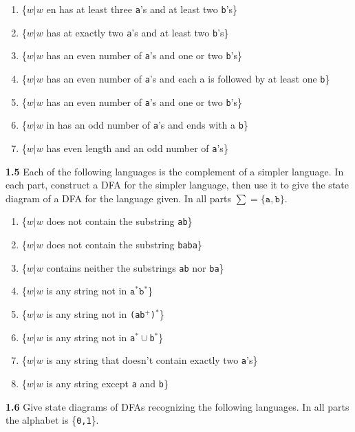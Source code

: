 \documentclass{article}
\begin{document}
    \begin{enumerate}
        \item \{$w|w$ en has at least three \texttt{a}'s and at least two \texttt{b}'s\}
        \item \{$w|w$ has at exactly two \texttt{a}'s and at least two \texttt{b}'s\}
        \item \{$w|w$ has an even number of \texttt{a}'s and one or two \texttt{b}'s\}
        \item \{$w|w$ has an even number of \texttt{a}'s and each a is followed by at least one \texttt{b}\}
        \item \{$w|w$ has an even number of \texttt{a}'s and one or two \texttt{b}'s\}
        \item \{$w|w$ in has an odd number of \texttt{a}'s and ends with a \texttt{b}\}
        \item \{$w|w$ has even length and an odd number of \texttt{a}'s\}
    \end{enumerate}

\textbf{1.5} Each of the following languages is the complement of a simpler
language. In each part, construct a DFA for the simpler language, then use it to
give the state diagram of a DFA for the language given. In all parts $\sum =
\{\texttt{a}, \texttt{b}\}$.

\begin{enumerate}
\item \{$w|w$ does not contain the substring \texttt{ab}\}
\item \{$w|w$ does not contain the substring \texttt{baba}\}
\item \{$w|w$ contains neither the substrings \texttt{ab} nor \texttt{ba}\}
\item \{$w|w$ is any string not in $\texttt{a}^* \texttt{b}^*$\}
\item \{$w|w$ is any string not in \texttt{(ab$^+$)$^*$}\}
\item \{$w|w$ is any string not in \texttt{a$^*\cup$b$^*$}\}
\item \{$w|w$ is any string that doesn't contain exactly two \texttt{a}'s\}
\item \{$w|w$ is any string except \texttt{a} and \texttt{b}\}
\end{enumerate}

\textbf{1.6} Give state diagrams of DFAs recognizing the following languages. In
all parts the alphabet is \{\texttt{0,1}\}.
\end{document}
